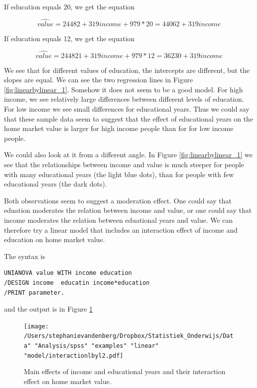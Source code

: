 \documentclass[]{book}\usepackage[]{graphicx}\usepackage[]{color}
\begin{document}
If education equals 20, we get the equation

\begin{equation}
\widehat{value}= 24482 + 319 income + 979 * 20 = 44062 + 319 income
\end{equation}

If education equals 12, we get the equation 

\begin{equation}
\widehat{value}= 244821 + 319 income + 979 * 12 = 36230 + 319 income
\end{equation}

We see that for different values of education, the intercepts are different, but the slopes are equal. We can see the two regression lines in Figure \ref{fig:linearbylinear_1}. Somehow it does not seem to be a good model. For high income, we see relatively large differences between different levels of education. For low income we see small differences for educational years. Thus we could say that these sample data seem to suggest that the effect of educational years on the home market value is larger for high income people than for for low income people.

We could also look at it from a different angle. In Figure \ref{fig:linearbylinear_1} we see that the relationships between income and value is much steeper for people with many educational years (the light blue dots), than for people with few educational years (the dark dots).

Both observations seem to suggest a moderation effect. One could say that eduation moderates the relation between income and value, or one could say that income moderates the relation between eduational years and value. We can therefore try a linear model that includes an interaction effect of income and education on home market value. 

The syntax is 

\begin{verbatim}
UNIANOVA value WITH income education
/DESIGN income  educatin income*education
/PRINT parameter.
\end{verbatim}

and the output is in Figure \ref{fig:interactionlbyl2}

\begin{figure}[h]
    \begin{center}
       \texttt{[image: /Users/stephanievandenberg/Dropbox/Statistiek\_Onderwijs/Data" "Analysis/spss" "examples"  "linear" "model/interactionlbyl2.pdf]}
    \end{center}
    \caption{Main effects of income and educational years and their interaction effect on home market value.}
    \label{fig:interactionlbyl2}
\end{figure}
\end{document}
